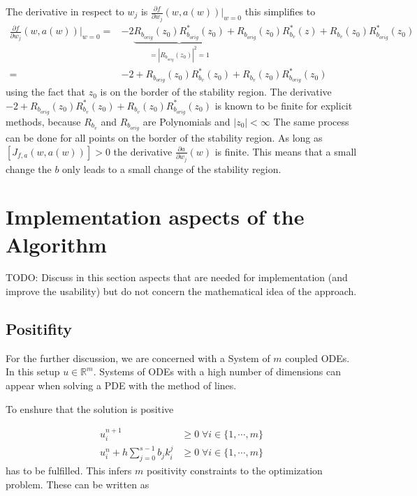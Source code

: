 \documentclass{article}
\begin{document}
The derivative in respect to $w_j$ is 
$ \frac{\partial f}{\partial w_j}(w,a(w)) \Big|_{w=0}$
this simplifies to 
\begin{align*}\label{eq:derivative_to_b}
 \frac{\partial f}{\partial w_j}(w,a(w)) \Big|_{w=0} =&
- 2 \underbrace{R_{b_{orig}}(z_0)R^*_{b_{orig}}(z_0)}_{=|R_{b_{orig}}(z_0)|^2=1} + R_{b_{orig}}(z_0)R^*_{b_v}(z) + R_{b_v}(z_0)R^*_{b_{orig}}(z_0) \\
=& -2 + R_{b_{orig}}(z_0)R^*_{b_v}(z_0) + R_{b_v}(z_0)R^*_{b_{orig}}(z_0)
\end{align*}
using the fact that $z_0$ is on the border of the stability region.
The derivative $-2 + R_{b_{orig}}(z_0)R^*_{b_v}(z_0) + R_{b_v}(z_0)R^*_{b_{orig}}(z_0)$ is known to be finite for explicit methods, because $R_{b_v}$ and $R_{b_{orig}}$ are Polynomials and $|z_0| < \infty$
The same process can be done for all points on the border of the stability region. 
As long as $\left[ J_{f,a}(w,a(w))  \right] > 0$ the derivative $\frac{\partial a}{\partial w_j} (w)$ is finite. This means that a small change the $b$ only leads to a small change of the stability region.


\section{Implementation aspects of the Algorithm}\label{sec:imple}

TODO: Discuss in this section aspects that are needed for implementation (and improve the usability) but do not concern the mathematical idea of the approach.

\subsection{Positifity}


For the further discussion, we are concerned with a System of $m$ coupled ODEs. 
In this setup $u \in \mathbb{R}^m$.
Systems of ODEs with a high number of dimensions can appear when solving a PDE with the method of lines.

To enshure that the solution is positive 

\begin{align}
 u_i^{n+1} &\geq 0   \;   \forall {i \in \{1, \cdots,m \}}  \\
 u_i^n + h \sum_{j=0}^{s-1} b_j k_i^j  &\geq 0   \;   \forall {i \in \{1,\cdots,m \}}  
\end{align}
has to be fulfilled.
This infers $m$ positivity constraints to the optimization problem. These can be written as
\end{document}
